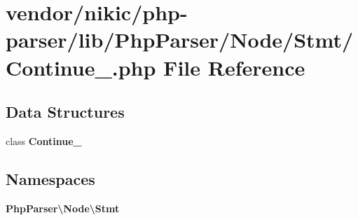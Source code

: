 \section{vendor/nikic/php-\/parser/lib/\+Php\+Parser/\+Node/\+Stmt/\+Continue\+\_\+.php File Reference}
\label{_continue___8php}
\subsection*{Data Structures}
\begin{DoxyCompactItemize}
\item 
class {\bf Continue\+\_\+}
\end{DoxyCompactItemize}
\subsection*{Namespaces}
\begin{DoxyCompactItemize}
\item 
 {\bf Php\+Parser\textbackslash{}\+Node\textbackslash{}\+Stmt}
\end{DoxyCompactItemize}
